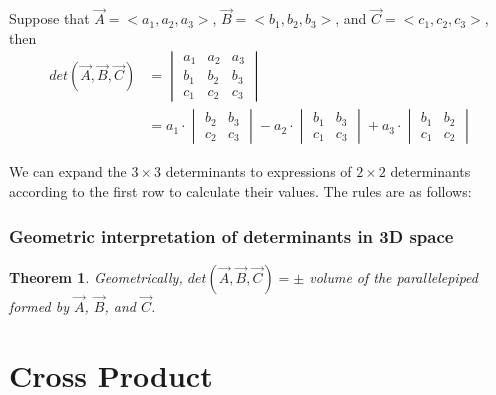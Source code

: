 \documentclass{article}
\newtheorem*{theorem}{Theorem}
\begin{document}
Suppose that $\vec{A} = <a_1, a_2, a_3>$, $\vec{B} = <b_1, b_2, b_3>$, and 
$\vec{C} = <c_1, c_2, c_3>$, then
\[
  \begin{split}
  det(\vec{A}, \vec{B}, \vec{C}) &= \begin{vmatrix}
                                    a_1 & a_2 & a_3 \\
                                    b_1 & b_2 & b_3 \\
                                    c_1 & c_2 & c_3
                                    \end{vmatrix} \\
                                 &= a_1 \cdot \begin{vmatrix}
                                              b_2 & b_3 \\
                                              c_2 & c_3
                                              \end{vmatrix} - 
                                    a_2 \cdot \begin{vmatrix}
                                              b_1 & b_3 \\
                                              c_1 & c_3
                                              \end{vmatrix} +
                                    a_3 \cdot \begin{vmatrix}
                                              b_1 & b_2 \\
                                              c_1 & c_2
                                              \end{vmatrix}
  \end{split}
\]

We can expand the $3 \times 3$ determinants to expressions of $2 \times 2$
determinants according to the first row to calculate their values. The rules
are as follows: 

\subsubsection{Geometric interpretation of determinants in 3D space}

\begin{theorem}
  Geometrically, $det(\vec{A}, \vec{B}, \vec{C}) = \pm$ volume of the
  parallelepiped formed by $\vec{A}$, $\vec{B}$, and $\vec{C}$.
\end{theorem}

\section{Cross Product}
\end{document}
